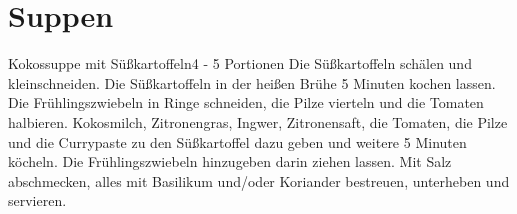 \documentclass[a4paper,10pt]{article}
\begin{document}
    \section{Suppen}
    
    \begin{recipe}{Kokossuppe mit Süßkartoffeln}{4 - 5 Portionen}{}
        Die Süßkartoffeln schälen und kleinschneiden. Die Süßkartoffeln in der 
        heißen Brühe 5 Minuten kochen lassen.
        Die Frühlingszwiebeln in Ringe schneiden, die Pilze vierteln und die Tomaten halbieren.
        Kokosmilch, Zitronengras, Ingwer, Zitronensaft, die Tomaten, die Pilze und die Currypaste zu den
        Süßkartoffel dazu geben und weitere 5 Minuten köcheln. Die Frühlingszwiebeln hinzugeben darin 
        ziehen lassen.
        Mit Salz abschmecken, alles mit Basilikum und/oder Koriander bestreuen, unterheben und servieren.
    \end{recipe}
    
    \newpage
       
\end{document}
